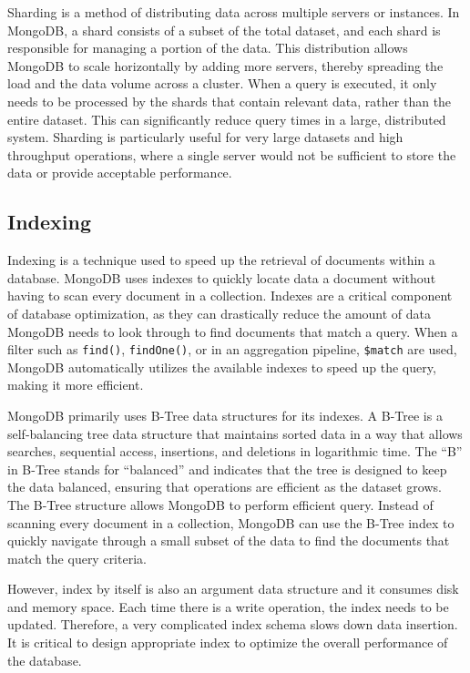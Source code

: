 Sharding is a method of distributing data across multiple servers or instances. In MongoDB, a shard consists of a subset of the total dataset, and each shard is responsible for managing a portion of the data. This distribution allows MongoDB to scale horizontally by adding more servers, thereby spreading the load and the data volume across a cluster. When a query is executed, it only needs to be processed by the shards that contain relevant data, rather than the entire dataset. This can significantly reduce query times in a large, distributed system. Sharding is particularly useful for very large datasets and high throughput operations, where a single server would not be sufficient to store the data or provide acceptable performance.

\subsection{Indexing}

Indexing is a technique used to speed up the retrieval of documents within a database. MongoDB uses indexes to quickly locate data a document without having to scan every document in a collection. Indexes are a critical component of database optimization, as they can drastically reduce the amount of data MongoDB needs to look through to find documents that match a query. When a filter such as \verb|find()|, \verb|findOne()|, or in an aggregation pipeline, \verb|$match| are used, MongoDB automatically utilizes the available indexes to speed up the query, making it more efficient.

\begin{shortbox}

MongoDB primarily uses B-Tree data structures for its indexes. A B-Tree is a self-balancing tree data structure that maintains sorted data in a way that allows searches, sequential access, insertions, and deletions in logarithmic time. The ``B'' in B-Tree stands for ``balanced'' and indicates that the tree is designed to keep the data balanced, ensuring that operations are efficient as the dataset grows. The B-Tree structure allows MongoDB to perform efficient query. Instead of scanning every document in a collection, MongoDB can use the B-Tree index to quickly navigate through a small subset of the data to find the documents that match the query criteria.
\end{shortbox}

However, index by itself is also an argument data structure and it consumes disk and memory space. Each time there is a write operation, the index needs to be updated. Therefore, a very complicated index schema slows down data insertion. It is critical to design appropriate index to optimize the overall performance of the database.

